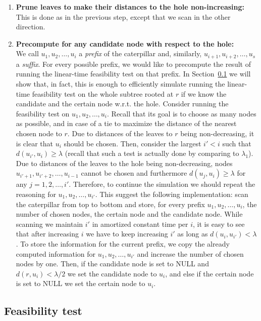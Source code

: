 \documentclass[a4paper,UKenglish]{lipics-v2016}
\theoremstyle{plain}
\begin{document}
\begin{enumerate}
\item \label{making distances from the hole monotone}
\textbf{Prune leaves to make their distances to the hole non-increasing:}\\
This is done as in the previous step, except that we scan in the other direction.
\item\label{precompute for any candidate node}\textbf{Precompute for any candidate node with respect to the hole:}\\
We call $u_{1},u_{2},\ldots,u_{i}$ a {\em prefix} of the caterpillar and, similarly, $u_{i+1},u_{i+2}, \ldots,u_{s}$ a {\em suffix}.
For every possible prefix, we would like to precompute the result of running the linear-time feasibility
test on that prefix. In Section~\ref{sec:feasibility test} we will show that, in fact, this is enough to efficiently
simulate running the linear-time feasibility test on the whole subtree rooted at $r$ if we know the candidate
and the certain node w.r.t. the hole. Consider running the feasibility test on $u_{1},u_{2},\ldots,u_{i}$.
Recall that its goal is to choose as many nodes as possible, and in case of a tie to maximize the distance of the
nearest chosen node to $r$. Due to distances of the leaves to $r$ being non-decreasing, it is clear that
$u_{i}$ should be chosen. Then, consider the largest $i'<i$ such that $d(u_{i'},u_{i})\geq \lambda$ (recall that
such a test is actually done by comparing to $\lambda_{1}$). Due to distances of the leaves to the hole
being non-decreasing, nodes $u_{i'+1},u_{i'+2},\ldots,u_{i-1}$ cannot be chosen and furthermore $d(u_{j},u_{i})\geq \lambda$
for any $j=1,2,\ldots,i'$. Therefore, to continue the simulation we should repeat the reasoning for $u_{1},u_{2},\ldots,u_{i'}$.
This suggest the following implementation: scan the caterpillar from top to bottom and store, for every prefix $u_{1},u_{2},\ldots,u_{i}$,
the number of chosen nodes, the certain node and the candidate node. While scanning we maintain $i'$ in amortized constant time per $i$,
it is easy to see that after increasing $i$ we have to keep increasing $i'$ as long as $d(u_{i},u_{i'})<\lambda$.
To store the information for the current prefix, we copy the already computed information for $u_{1},u_{2},\ldots,u_{i'}$
and increase the number of chosen nodes by one. Then, if the candidate node is set to NULL and $d(r,u_{i})<\lambda/2$
we set the candidate node to $u_{i}$, and else if the certain node is set to NULL we set the certain node to $u_{i}$.
\end{enumerate}

\subsection{Feasibility test}
\label{sec:feasibility test}
\end{document}
